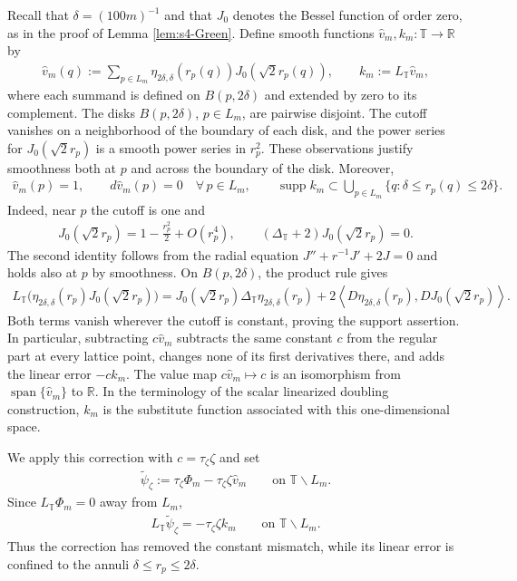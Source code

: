 \documentclass[a4paper,11pt,oneside,reqno]{amsart}
\numberwithin{equation}{section}
\theoremstyle{definition}
\begin{document}
Recall that $\delta=(100m)^{-1}$ and that $J_0$ denotes the Bessel function of order zero, as in the proof of Lemma \ref{lem:s4-Green}. Define smooth functions
$\widehat v_m,k_m:\mathbb T\to\mathbb R$ by
%
\begin{align}
    \label{eq:s4-substitute}
    \widehat v_m(q)
    :=\sum_{p\in L_m}
      \eta_{2\delta,\delta}(r_p(q))
      J_0(\sqrt2r_p(q)),
    \qquad
    k_m:=L_{\mathbb T}\widehat v_m,
\end{align}
%
where each summand is defined on $B(p,2\delta)$ and
extended by zero to its complement. The disks
$B(p,2\delta)$, $p\in L_m$, are pairwise disjoint.
The cutoff vanishes on a neighborhood of the boundary of
each disk, and the power series for $J_0(\sqrt2r_p)$
is a smooth power series in $r_p^2$. These observations
justify smoothness both at $p$ and across the boundary
of the disk. Moreover,
%
\begin{align}
    \label{eq:s4-substitute-properties}
    \widehat v_m(p)=1,\qquad
    d\widehat v_m(p)=0
    \quad\forall\,p\in L_m,
    \qquad
    \operatorname{supp}k_m
    \subset\bigcup_{p\in L_m}
           \{q:\delta\leq r_p(q)\leq2\delta\}.
\end{align}
%
Indeed, near $p$ the cutoff is one and
%
\begin{align*}
    J_0(\sqrt2r_p)
    =1-\frac{r_p^2}{2}+O(r_p^4),
    \qquad
    (\Delta_{\mathbb T}+2)J_0(\sqrt2r_p)=0.
\end{align*}
%
The second identity follows from the radial equation
$J''+r^{-1}J'+2J=0$ and holds also at $p$ by smoothness.
On $B(p,2\delta)$, the product rule gives
%
\begin{align*}
    L_{\mathbb T}
    \bigl(\eta_{2\delta,\delta}(r_p)J_0(\sqrt2r_p)\bigr)
    =J_0(\sqrt2r_p)
        \Delta_{\mathbb T}\eta_{2\delta,\delta}(r_p)+2\left\langle
        D\eta_{2\delta,\delta}(r_p),
        DJ_0(\sqrt2r_p)\right\rangle.
\end{align*}
%
Both terms vanish wherever the cutoff is constant, proving
the support assertion. In particular, subtracting
$c\widehat v_m$ subtracts the same constant $c$ from the
regular part at every lattice point, changes none of its
first derivatives there, and adds the linear error $-ck_m$.
The value map $c\widehat v_m\mapsto c$ is an isomorphism
from $\operatorname{span}\{\widehat v_m\}$ to $\mathbb R$.
In the terminology of the scalar linearized doubling
construction, $k_m$ is the substitute function associated
with this one-dimensional space.

We apply this correction with $c=\tau_\zeta\zeta$ and set
%
\begin{align}
    \label{eq:s4-corrected-exterior}
    \widetilde\psi_\zeta
    :=\tau_\zeta\Phi_m
       -\tau_\zeta\zeta\widehat v_m
    \qquad\text{on }\mathbb T\smallsetminus L_m.
\end{align}
%
Since $L_{\mathbb T}\Phi_m=0$ away from $L_m$,
%
\begin{align*}
    L_{\mathbb T}\widetilde\psi_\zeta
    =-\tau_\zeta\zeta k_m
    \qquad\text{on }\mathbb T\smallsetminus L_m.
\end{align*}
%
Thus the correction has removed the constant mismatch,
while its linear error is confined to the annuli
$\delta\leq r_p\leq2\delta$.
\end{document}
